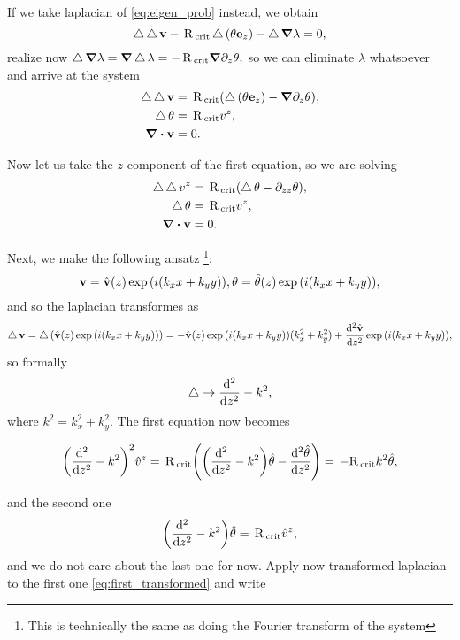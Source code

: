 \documentclass[../main.tex]{subfiles}
\begin{document}
If we take laplacian of \ref{eq:eigen_prob} instead, we obtain 
\[
	\operatorname{\bigtriangleup} \operatorname{\bigtriangleup} \vb{v} - \, \text{R} \,_{\text{crit}} \operatorname{\bigtriangleup}\qty(\theta \vb{e}_z) - \operatorname{\bigtriangleup} \grad \lambda=0,
\]
realize now $\operatorname{\bigtriangleup} \grad \lambda = \grad \operatorname{\bigtriangleup} \lambda = - \, \text{R} \,_{\text{crit}} \grad \partial_{z}\theta,$ so we can eliminate $\lambda$ whatsoever and arrive at the system
\begin{align*}
	\laplace \laplace \vb{v} &= \, \text{R} \,_{\text{crit}} \qty(\laplace \qty(\theta \vb{e}_z) - \grad \partial_{z} \theta), \\
	\laplace \theta &=  \, \text{R} \,_{\text{crit}}v^z, \\
	\divergence{\vb{v}}&= 0.
\end{align*}

Now let us take the $z$ component of the first equation, so we are solving
\begin{align*}
	\laplace \laplace v^z &= \, \text{R} \,_{\text{crit}}\qty(\laplace \theta-\partial_{zz}\theta ), \\
	\laplace \theta &= \, \text{R} \,_{\text{crit}} v^z, \\
	\divergence{\vb{v}} &= 0.
\end{align*}

Next, we make the following ansatz \footnote{This is technically the same as doing the Fourier transform of the system}:
\[
	\vb{v} = \hat{\vb{v}}(z) \exp\qty(i(k_x x + k_y y)), \theta = \hat{\theta}(z) \exp\qty(i(k_x x+ k_y y)),
\]
and so the laplacian transformes as
\[
	\operatorname{\bigtriangleup} \vb{v} = \operatorname{\bigtriangleup}\qty(\hat{\vb{v}}(z) \exp\qty(i\qty(k_x x + k_y y))) =- \hat{\vb{v}}(z)\exp\qty(i\qty(k_x x + k_y y))(k_x^{2} + k_y^{2})+ \dv[2]{\hat{\vb{v}}}{z}\exp\qty(i\qty(k_x x + k_y y)),
\]
so formally
\[
	\operatorname{\bigtriangleup} \to \dv[2]{z} - k^{2},
\]
where $k^{2} = k_x^{2} + k_y^{2}.$
The first equation now becomes

\begin{equation}
	\label{eq:first_transformed}
	\qty(\dv[2]{z} - k^{2})^{2} \hat{v}^z = \, \text{R} \,_{\text{crit}}\qty(\qty(\dv[2]{z}-k^{2})\hat{\theta} - \dv[2]{\hat{\theta}}{z}) = \, -\text{R} \,_{\text{crit}} k^{2} \hat{\theta},
\end{equation}

and the second one
\begin{equation}
	\label{eq:second_transformed}
	\qty(\dv[2]{z}-k^{2}) \hat{\theta} = \, \text{R} \,_{\text{crit}} \hat{v}^z,
\end{equation}
and we do not care about the last one for now. Apply now transformed laplacian to the first one \ref{eq:first_transformed} and write
\end{document}
